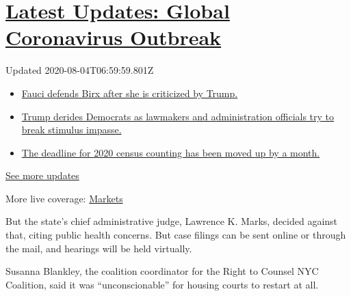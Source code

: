 \hypertarget{latest-updates-global-coronavirus-outbreak}{%
\section{\texorpdfstring{\href{https://www.nytimes.com/2020/08/03/world/coronavirus-covid-19.html?action=click\&pgtype=Article\&state=default\&region=MAIN_CONTENT_1\&context=storylines_live_updates}{Latest
Updates: Global Coronavirus
Outbreak}}{Latest Updates: Global Coronavirus Outbreak}}\label{latest-updates-global-coronavirus-outbreak}}

Updated 2020-08-04T06:59:59.801Z

\begin{itemize}
\tightlist
\item
  \href{https://www.nytimes.com/2020/08/03/world/coronavirus-covid-19.html?action=click\&pgtype=Article\&state=default\&region=MAIN_CONTENT_1\&context=storylines_live_updates\#link-4547638f}{Fauci
  defends Birx after she is criticized by Trump.}
\item
  \href{https://www.nytimes.com/2020/08/03/world/coronavirus-covid-19.html?action=click\&pgtype=Article\&state=default\&region=MAIN_CONTENT_1\&context=storylines_live_updates\#link-15e7f995}{Trump
  derides Democrats as lawmakers and administration officials try to
  break stimulus impasse.}
\item
  \href{https://www.nytimes.com/2020/08/03/world/coronavirus-covid-19.html?action=click\&pgtype=Article\&state=default\&region=MAIN_CONTENT_1\&context=storylines_live_updates\#link-e5a2cda}{The
  deadline for 2020 census counting has been moved up by a month.}
\end{itemize}

\href{https://www.nytimes.com/2020/08/03/world/coronavirus-covid-19.html?action=click\&pgtype=Article\&state=default\&region=MAIN_CONTENT_1\&context=storylines_live_updates}{See
more updates}

More live coverage:
\href{https://www.nytimes.com/live/2020/08/03/business/stock-market-today-coronavirus?action=click\&pgtype=Article\&state=default\&region=MAIN_CONTENT_1\&context=storylines_live_updates}{Markets}

But the state's chief administrative judge, Lawrence K. Marks, decided
against that, citing public health concerns. But case filings can be
sent online or through the mail, and hearings will be held virtually.

Susanna Blankley, the coalition coordinator for the Right to Counsel NYC
Coalition, said it was ``unconscionable'' for housing courts to restart
at all.

